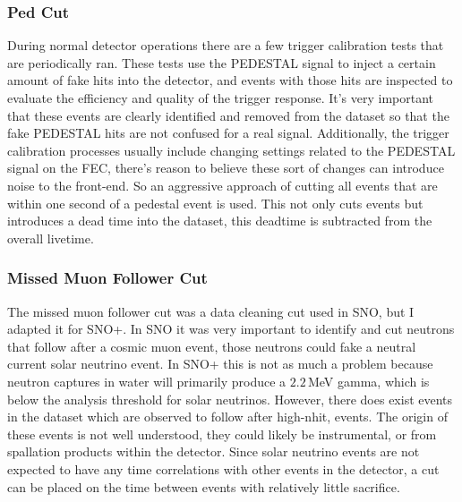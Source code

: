 \subsubsection{Ped Cut}
During normal detector operations there are a few trigger calibration
tests that are periodically ran.
These tests use the PEDESTAL signal to inject a certain amount of fake hits
into the detector, and events with those hits are inspected to evaluate the efficiency and
quality of the trigger response.
It's very important that these events are clearly identified and removed from the
dataset so that the fake PEDESTAL hits are not confused for a real signal.
Additionally, the trigger calibration processes usually include changing settings
related to the PEDESTAL signal on the FEC, there's reason to believe these sort
of changes can introduce noise to the front-end.
So an aggressive approach of cutting all events that are within one second of
a pedestal event is used.
This not only cuts events but introduces a dead time into the dataset,
this deadtime is subtracted from the overall livetime.

\subsubsection{Missed Muon Follower Cut}
The missed muon follower cut was a data cleaning cut used in SNO, but I adapted
it for SNO+.
In SNO it was very important to identify and cut neutrons that follow
after a cosmic muon event, those neutrons could fake
a neutral current solar neutrino event.
In SNO+ this is not as much a problem because neutron captures in water will
primarily produce a $2.2$\,MeV gamma, which is below the analysis threshold for
solar neutrinos.
However, there does exist events in the dataset which are observed to follow
after high-nhit, events. The origin of these events is not well understood, they
could likely be instrumental, or from  spallation products within the detector.
Since solar neutrino events are not expected to have any time correlations
with other events in the detector, a cut can be placed on the time between
events with relatively little sacrifice.\\

